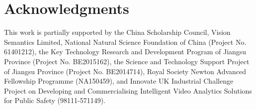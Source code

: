 \documentclass[runningheads]{llncs}
\begin{document}
\section*{Acknowledgments}
\small
This work is partially supported by the China Scholarship Council, 
Vision Semantics Limited,
National Natural Science Foundation of China (Project No. 61401212), 
the Key Technology Research and Development Program of Jiangsu Province (Project No. BE2015162), the Science and Technology Support Project of Jiangsu Province (Project No. BE2014714),
Royal Society Newton Advanced Fellowship Programme (NA150459),
and Innovate UK Industrial Challenge Project on Developing and Commercialising Intelligent Video Analytics Solutions for Public Safety (98111-571149).



 
\end{document}
